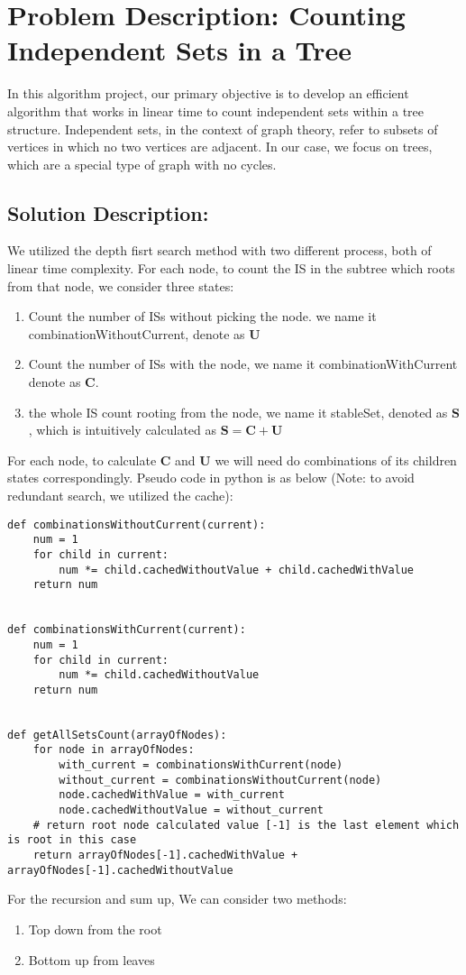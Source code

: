 \documentclass{article}
\begin{document}
\section*{Problem Description: Counting Independent Sets in a Tree}

In this algorithm project, our primary objective is to develop an efficient algorithm that works in linear time to count independent sets within a tree structure. Independent sets, in the context of graph theory, refer to subsets of vertices in which no two vertices are adjacent. In our case, we focus on trees, which are a special type of graph with no cycles.

\subsection*{Solution Description:}
We utilized the depth fisrt search method with two different process, both of linear time complexity. 
For each node, to count the IS in the subtree which roots from that node, we consider three states: 
\begin{enumerate}
  \item Count the number of ISs without picking the node. we name it combinationWithoutCurrent, denote as $\bm{U}$ \item Count the number of ISs with the node, we name it combinationWithCurrent denote as $\bm{C}$. \item the whole IS count rooting from the node, we name it stableSet, denoted as $\bm{S}$ , which is intuitively calculated as
$\bm{S} = \bm{C} + \bm{U}$ 
\end{enumerate}
For each node, to calculate $\bm{C}$ and $\bm{U}$ 
we will need do combinations of its children states correspondingly. Pseudo code in python is as below (Note: to avoid redundant search, we utilized the cache):
\newpage
\begin{lstlisting}
def combinationsWithoutCurrent(current):
    num = 1
    for child in current:
        num *= child.cachedWithoutValue + child.cachedWithValue
    return num


def combinationsWithCurrent(current):
    num = 1
    for child in current:
        num *= child.cachedWithoutValue
    return num


def getAllSetsCount(arrayOfNodes):
    for node in arrayOfNodes:
        with_current = combinationsWithCurrent(node)
        without_current = combinationsWithoutCurrent(node)
        node.cachedWithValue = with_current
        node.cachedWithoutValue = without_current
    # return root node calculated value [-1] is the last element which is root in this case
    return arrayOfNodes[-1].cachedWithValue + arrayOfNodes[-1].cachedWithoutValue
\end{lstlisting}
For the recursion and sum up,
We can consider two methods: 
\begin{enumerate}
      \item Top down from the root \item Bottom up from leaves
\end{enumerate}
\end{document}
